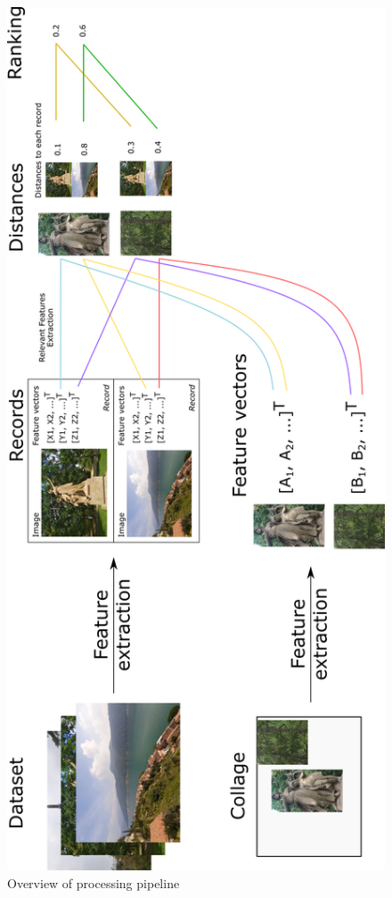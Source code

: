 \begin{figure}[p!]
    \centering
    \includegraphics[scale=0.9]{img/features_pipeline.png}
    \caption{Overview of processing pipeline}
    \label{fig:processing_pipeline}
\end{figure}

